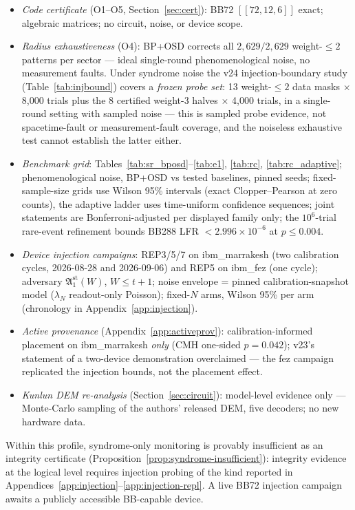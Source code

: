 \documentclass[11pt,a4paper]{article}
\begin{document}
\begin{itemize}[leftmargin=1.6em,itemsep=1pt,topsep=2pt]
\item \emph{Code certificate} (O1--O5, Section~\ref{sec:cert}): BB72
  $[[72,12,6]]$ exact; algebraic matrices; no circuit, noise, or
  device scope.
\item \emph{Radius exhaustiveness} (O4): BP+OSD corrects all
  $2{,}629/2{,}629$ weight-$\le2$ patterns per sector --- ideal
  single-round phenomenological noise, no measurement faults. Under
  syndrome noise the v24 injection-boundary study
  (Table~\ref{tab:injbound}) covers a \emph{frozen probe set}: 13
  weight-$\le2$ data masks $\times$ 8{,}000 trials plus the 8 certified
  weight-3 halves $\times$ 4{,}000 trials, in a single-round setting
  with sampled noise --- this is sampled probe evidence, not
  spacetime-fault or measurement-fault coverage, and the noiseless
  exhaustive test cannot establish the latter either.
\item \emph{Benchmark grid}: Tables~\ref{tab:sr_bposd}--\ref{tab:e1},
  \ref{tab:rc}, \ref{tab:rc_adaptive}; phenomenological noise, BP+OSD
  vs tested baselines, pinned seeds; fixed-sample-size grids use Wilson
  95\% intervals (exact Clopper--Pearson at zero counts), the adaptive
  ladder uses time-uniform confidence sequences; joint statements are
  Bonferroni-adjusted per displayed family only;
  the $10^6$-trial rare-event refinement bounds BB288 LFR
  $<2.996\times10^{-6}$ at $p\le0.004$.
\item \emph{Device injection campaigns}: REP3/5/7 on ibm\_marrakesh
  (two calibration cycles, 2026-08-28 and 2026-09-06) and REP5 on
  ibm\_fez (one cycle); adversary $\mathfrak{A}_1^{\mathrm{st}}(W)$,
  $W\le t{+}1$; noise envelope = pinned calibration-snapshot model
  ($\lambda_N$ readout-only Poisson); fixed-$N$ arms, Wilson 95\% per
  arm (chronology in Appendix~\ref{app:injection}).
\item \emph{Active provenance} (Appendix~\ref{app:activeprov}):
  calibration-informed placement on ibm\_marrakesh \emph{only}
  (CMH one-sided $p=0.042$); v23's statement of a two-device
  demonstration overclaimed --- the fez campaign replicated the
  injection bounds, not the placement effect.
\item \emph{Kunlun DEM re-analysis} (Section~\ref{sec:circuit}):
  model-level evidence only --- Monte-Carlo sampling of the authors'
  released DEM, five decoders; no new hardware data.
\end{itemize}

Within this profile, syndrome-only monitoring is provably insufficient
as an integrity certificate
(Proposition~\ref{prop:syndrome-insufficient}): integrity evidence at
the logical level requires injection probing of the kind reported in
Appendices~\ref{app:injection}--\ref{app:injection-repl}. A live BB72
injection campaign awaits a publicly accessible BB-capable device.
\end{document}
